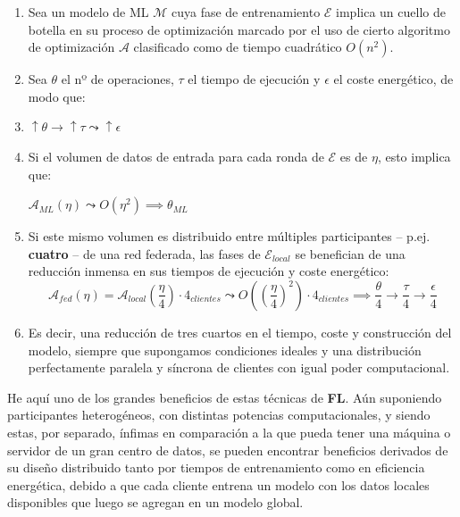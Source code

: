 \documentclass[00-Trabajo_Final.tex]{subfiles}
\begin{document}
\begin{enumerate}[itemsep=5pt]
    \item Sea un modelo de ML $\mathcal{M}$ cuya fase de entrenamiento $\mathcal{E}$ implica un cuello de botella en su proceso de optimización marcado por el uso de cierto algoritmo de optimización $\mathcal{A}$ clasificado como de tiempo cuadrático $O(n^2)$.
    \item Sea $\theta$ el nº de operaciones, $\tau$ el tiempo de ejecución y  $\epsilon$ el coste energético, de modo que: 
    \item[] \begin{center}$\uparrow \theta \rightarrow \uparrow \tau \leadsto \uparrow \epsilon$ \end{center}
    \item Si el volumen de datos de entrada para cada ronda de $\mathcal{E}$ es de $\eta$, esto implica que: \begin{center}$\mathcal{A}_{ML}(\eta) \leadsto O(\eta^2) \implies \theta_{ML}$\end{center}
    \item Si este mismo volumen es distribuido entre múltiples participantes{ }--{ }p.ej. \textbf{cuatro}{ }--{ }de una red federada, las fases de $\mathcal{E}_{local}$ se benefician de una reducción inmensa en sus tiempos de ejecución y coste energético:
    \begin{equation}
        \mathcal{A}_{fed}(\eta) = \mathcal{A}_{local}(\frac{\eta}{4}) \cdot 4_\textit{clientes}  \leadsto O((\frac{\eta}{4})^2) \cdot 4_\textit{clientes} \implies \frac{\theta}{4} \rightarrow \frac{\tau}{4} \rightarrow \frac{\epsilon}{4} 
    \end{equation}
    \item Es decir, una reducción de tres cuartos en el tiempo, coste y construcción del modelo, siempre que supongamos condiciones ideales y una distribución perfectamente paralela y síncrona de clientes con igual poder computacional.
\end{enumerate}

He aquí uno de los grandes beneficios de estas técnicas de \textbf{FL}. Aún suponiendo participantes heterogéneos, con distintas potencias computacionales, y siendo estas, por separado, ínfimas en comparación a la que pueda tener una máquina o servidor de un gran centro de datos, se pueden encontrar beneficios derivados de su diseño distribuido tanto por tiempos de entrenamiento como en eficiencia energética, debido a que cada cliente entrena un modelo con los datos locales disponibles que luego se agregan en un modelo global.
\end{document}
